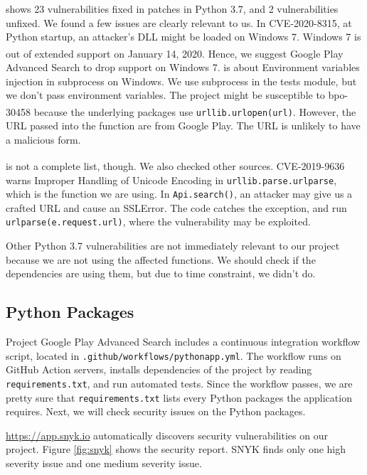 \documentclass[12pt, a4paper]{article}
\newcommand{\code}[1]{\texttt{#1}}
\begin{document}
\cite{python37-vulnerability} shows 23 vulnerabilities fixed in patches in Python 3.7, and 2 vulnerabilities unfixed. We found a few issues are clearly relevant to us. In CVE-2020-8315, at Python startup, an attacker's DLL might be loaded on Windows 7. Windows 7 is out of extended support on January 14, 2020.\textsuperscript{\cite{windows7}} Hence, we suggest Google Play Advanced Search to drop support on Windows 7. \cite{bpo-30730} is about Environment variables injection in subprocess on Windows. We use subprocess in the tests module, but we don't pass environment variables. The project might be susceptible to bpo-30458\textsuperscript{\cite{bpo-30458}} because the underlying packages use \code{urllib.urlopen(url)}. However, the URL passed into the function are from Google Play. The URL is unlikely to have a malicious form.

\cite{python37-vulnerability} is not a complete list, though. We also checked other sources. CVE-2019-9636\textsuperscript{\cite{CVE-2019-9636}} warns Improper Handling of Unicode Encoding in \code{urllib\linebreak[0].parse\linebreak[0].urlparse}, which is the function we are using. In \code{Api.search()}, an attacker may give us a crafted URL and cause an SSLError. The code catches the exception, and run \code{urlparse(e.request.url)}, where the vulnerability may be exploited.

Other Python 3.7 vulnerabilities are not immediately relevant to our project because we are not using the affected functions. We should check if the dependencies are using them, but due to time constraint, we didn't do.



\subsection{Python Packages}
Project Google Play Advanced Search includes a continuous integration workflow script, located in \code{.github/workflows/pythonapp.yml}. The workflow runs on GitHub Action servers, installs dependencies of the project by reading \code{requirements.txt}, and run automated tests. Since the workflow passes, we are pretty sure that \code{requirements.txt} lists every Python packages the application requires. Next, we will check security issues on the Python packages.

\url{https://app.snyk.io} automatically discovers security vulnerabilities on our project. Figure \ref{fig:snyk} shows the security report. SNYK finds only one high severity issue and one medium severity issue. 
\end{document}
